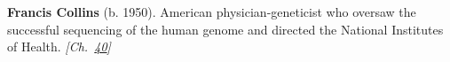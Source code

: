 \textbf{Francis Collins} (b. 1950). American physician-geneticist who oversaw the successful sequencing of the human genome and directed the National Institutes of Health. \emph{[Ch.~\hyperref[ch:dnasequencing]{40}]}

